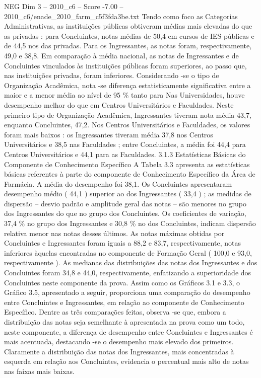 \begin{textsample}{NEG Dim 3 – 2010\_c6 – Score -7.00 – 2010\_c6/enade\_2010\_farm\_c5f3fda3be.txt}
Tendo como foco as Categorias Administrativas, as instituições públicas obtiveram médias mais elevadas do que as privadas : para Concluintes, notas médias de 50,4 em cursos de IES públicas e de 44,5 nos das privadas.
Para os Ingressantes, as notas foram, respectivamente, 49,0 e 38,8.
Em comparação à média nacional, as notas de Ingressantes e de Concluintes vinculados às instituições públicas foram superiores, ao passo que, nas instituições privadas, foram inferiores.
Considerando -se o tipo de Organização Acadêmica, nota -se diferença estatisticamente significativa entre a maior e a menor média ao nível de 95 \% tanto para Nas Universidades, houve desempenho melhor do que em Centros Universitários e Faculdades.
Neste primeiro tipo de Organização Acadêmica, Ingressantes tiveram nota média 43,7, enquanto Concluintes, 47,2.
Nos Centros Universitários e Faculdades, os valores foram mais baixos : os Ingressantes tiveram média 37,8 nos Centros Universitários e 38,5 nas Faculdades ; entre Concluintes, a média foi 44,4 para Centros Universitários e 44,1 para as Faculdades. 3.1.3 Estatísticas Básicas do Componente de Conhecimento Específico A Tabela 3.3 apresenta as estatísticas básicas referentes à parte do componente de Conhecimento Específico da Área de Farmácia.
A média do desempenho foi 38,1.
Os Concluintes apresentaram desempenho médio ( 44,1 ) superior ao dos Ingressantes ( 33,4 ) ; as medidas de dispersão – desvio padrão e amplitude geral das notas – são menores no grupo dos Ingressantes do que no grupo dos Concluintes.
Os coeficientes de variação, 37,4 \% no grupo dos Ingressantes e 30,8 \% no dos Concluintes, indicam dispersão relativa menor nas notas desses últimos.
As notas máximas obtidas por Concluintes e Ingressantes foram iguais a 88,2 e 83,7, respectivamente, notas inferiores àquelas encontradas no componente de Formação Geral ( 100,0 e 93,0, respectivamente ).
As medianas das distribuições das notas dos Ingressantes e dos Concluintes foram 34,8 e 44,0, respectivamente, enfatizando a superioridade dos Concluintes neste componente da prova.
Assim como os Gráficos 3.1 e 3.3, o Gráfico 3.5, apresentado a seguir, proporciona uma comparação do desempenho entre Concluintes e Ingressantes, em relação ao componente de Conhecimento Específico.
Dentre as três comparações feitas, observa -se que, embora a distribuição das notas seja semelhante à apresentada na prova como um todo, neste componente, a diferença de desempenho entre Concluintes e Ingressantes é mais acentuada, destacando -se o desempenho mais elevado dos primeiros.
Claramente a distribuição das notas dos Ingressantes, mais concentradas à esquerda em relação aos Concluintes, evidencia o percentual mais alto de notas nas faixas mais baixas.

\end{textsample}
